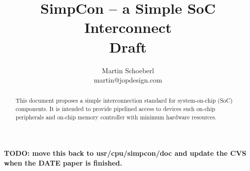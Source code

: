 \documentclass[a4paper,12pt]{scrartcl}
\begin{document}
\title{SimpCon -- a Simple SoC Interconnect\\Draft}
\author{Martin Schoeberl\\ martin@jopdesign.com}
\maketitle \thispagestyle{empty}

\begin{abstract}

This document proposes a simple interconnection standard for
system-on-chip (SoC) components. It is intended to provide pipelined
access to devices such on-chip peripherals and on-chip memory
controller with minimum hardware resources.


\end{abstract}

\textbf{TODO: move this back to usr/cpu/simpcon/doc and update the
CVS when the DATE paper is finished.}


\end{document}
